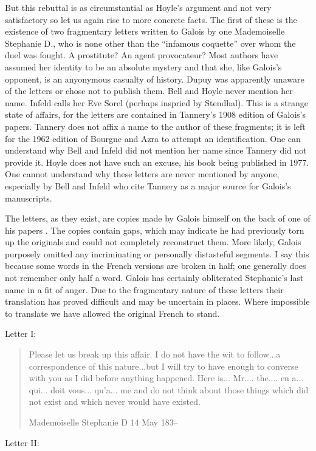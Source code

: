 \documentclass[12pt]{article}
\begin{document}
But this rebuttal is as circumstantial as Hoyle's argument and not very satisfactory so let us again rise to more concrete facts. The first of these is the existence of two fragmentary letters written to Galois by one Mademoiselle Stephanie D., who is none other than the ``infamous coquette'' over whom the duel was fought. A prostitute? An agent provocateur? Most authors have assumed her identity to be an absolute mystery and that she, like Galois's opponent, is an anyonymous casualty of history. Dupuy was apparently unaware of the letters or chose not to publish them. Bell and Hoyle never mention her name. Infeld calls her Eve Sorel (perhaps inspried by Stendhal). This is a strange state of affairs, for the letters are contained in Tannery's 1908 edition of Galois's papers. Tannery does not affix a name to the author of these fragments; it is left for the 1962 edition of Bourgne and Azra to attempt an identification. One can understand why Bell and Infeld did not mention her name since Tannery did not provide it. Hoyle does not have such an excuse, his book being published in 1977. One cannot understand why these letters are never mentioned by anyone, especially by Bell and Infeld who cite Tannery as a major source for Galois's manuscripts.

The letters, as they exist, are copies made by Galois himself on the back of one of his papers \cite{91}. The copies contain gaps, which may indicate he had previously torn up the originals and could not completely reconstruct them. More likely, Galois purposely omitted any incriminating or personally distasteful segments. I say this because some words in the French versions are broken in half; one generally does not remember only half a word. Galois has certainly obliterated Stephanie's last name in a fit of anger. Due to the fragmentary nature of these letters their translation has proved difficult and may be uncertain in places. Where impossible to translate we have allowed the original French to stand.

\medskip\noindent
Letter I: 

\begin{quote}
Please let us break up this affair. I do not have the wit to follow...a correspondence of this nature...but I will try to have enough to converse with you as I did before anything happened. Here is... Mr.... the.... en a... qui... doit vous... qu'a... me and do not think about those things which did not exist and which never would have existed. 

\medskip
\hfill Mademoiselle Stephanie D 14 May 183--
\end{quote}
Letter II:
\end{document}
